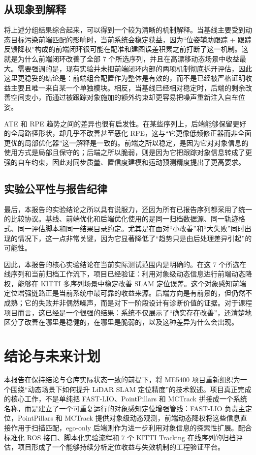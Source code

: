 \documentclass[utf8, a4paper, 12pt]{ctexart}
\begin{document}
\subsection{从现象到解释}
将上述分组结果综合起来，可以得到一个较为清晰的机制解释。当基线主要受到动态目标污染前端匹配的影响时，当前系统会稳定获益，因为“位姿辅助跟踪 + 跟踪反馈降权”构成的前端闭环很可能在配准和建图误差积累之前打断了这一机制。这就是为什么前端闭环改善了全部 7 个所选序列，并且在高漂移动态场景中收益最大。需要强调的是，现有实验并未把前端闭环内部的两项机制彻底拆开评估，因此这里更稳妥的结论是：前端组合配置作为整体是有效的，而不是已经被严格证明收益主要且唯一来自某一个单独模块。相反，当基线已经相对稳定时，后端的剩余改善空间变小，而通过被跟踪对象施加的额外约束却更容易把噪声重新注入自车位姿。

ATE 和 RPE 趋势之间的差异也很有启发性。在某些序列上，后端能够保留更好的全局路径形状，却几乎不改善甚至恶化 RPE，这与“它更像低频修正器而非全面更优的局部优化器”这一解释是一致的。前端之所以稳定，是因为它对对象信息的使用方式是局部且保守的；后端之所以脆弱，则是因为它把跟踪对象信息转成了更强的自车约束，因此对同步质量、置信度建模和运动预测精度提出了更高要求。

\subsection{实验公平性与报告纪律}
最后，本报告的实验结论之所以具有说服力，还因为所有已报告序列都采用了统一的比较协议。基线、前端优化和后端优化使用的是同一归档数据源、同一轨迹格式、同一评估脚本和同一结果目录约定。尤其是在面对“小改善”和“大失败”同时出现的情况下，这一点非常关键，因为它显著降低了“趋势只是由后处理差异引起”的可能性。

因此，本报告的核心实验结论在当前实际测试范围内是明确的。在这 7 个所选在线序列和当前归档工作流下，项目已经验证：利用对象级动态信息进行前端动态降权，能够在 KITTI 多序列场景中稳定改善 SLAM 定位误差。这个对象感知前端定位增强链路正是当前系统中最可靠的收益来源。后端方向是有前景的，但仍然不成熟；它的失败并非偶然噪声，而是对下一阶段设计有诊断价值的证据。对于课程项目而言，这已经是一个很强的结果：系统不仅展示了“确实存在改善”，还清楚地区分了改善在哪里是稳健的，在哪里是脆弱的，以及这种差异为什么会出现。

\section{结论与未来计划}
本报告在保持结论与仓库实际状态一致的前提下，将 ME5400 项目重新组织为一个围绕“动态场景下如何提升 LiDAR SLAM 定位精度”的技术叙述。项目真正完成的核心工作，不是单纯把 FAST-LIO、PointPillars 和 MCTrack 拼接成一个系统名称，而是建立了一个可重复运行的对象感知定位增强管线：FAST-LIO 负责主定位，PointPillars 和 MCTrack 提供对象级动态观测，前端动态降权将这些信息直接作用于扫描匹配，ego-only 后端则作为进一步利用对象信息的探索性扩展。配合标准化 ROS 接口、脚本化实验流程和 7 个 KITTI Tracking 在线序列的归档评估，项目形成了一个能够持续分析定位收益与失效机制的工程验证平台。
\end{document}
